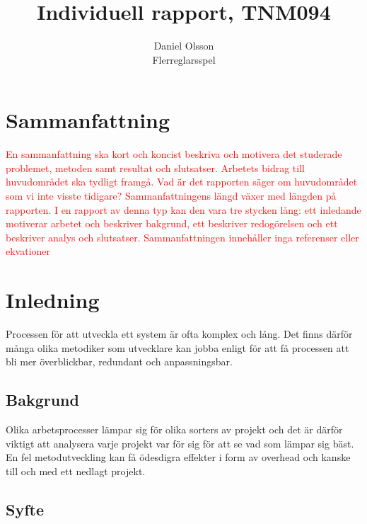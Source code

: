 \documentclass[a4paper,12pt,oneside,final]{extbook}
\title{Individuell rapport, TNM094}
\author{Daniel Olsson\\Flerreglarsspel}
\begin{document}
\pagestyle{empty}
\thispagestyle{empty}

\frontmatter

\maketitle

\pagestyle{fancy}

\chapter{Sammanfattning}

\textcolor{red}{
En sammanfattning ska kort och koncist beskriva och motivera det studerade problemet, metoden
samt resultat och slutsatser. Arbetets bidrag till huvudområdet ska tydligt framgå. Vad är det rapporten
säger om huvudområdet som vi inte visste tidigare?
Sammanfattningens längd växer med längden på rapporten. I en rapport av denna typ kan den vara tre
stycken lång: ett inledande motiverar arbetet och beskriver bakgrund, ett beskriver redogörelsen och
ett beskriver analys och slutsatser. Sammanfattningen innehåller inga referenser eller ekvationer}


\tableofcontents

\cleardoublepage
{}
\listoffigures

\cleardoublepage
{}
\listoftables

\mainmatter

\chapter{Inledning}
\label{ch:inledning}

Processen för att utveckla ett system är ofta komplex och lång. Det finns därför många olika metodiker som utvecklare kan jobba enligt för att få processen att bli mer överblickbar, redundant och anpassningsbar. 

\section{Bakgrund}
Olika arbetsprocesser lämpar sig för olika sorters av projekt och det är därför viktigt att analysera varje projekt var för sig för att se vad som lämpar sig bäst. En fel metodutveckling kan få ödesdigra effekter i form av overhead och kanske till och med ett nedlagt projekt.
\section{Syfte}
\end{document}
